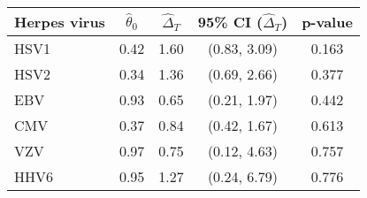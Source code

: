 \begin{tabular}{lcccc} 
\toprule
Herpes virus  & $\hat \theta_0$ & $\hat \Delta_T$ & 95\% CI ($\hat \Delta_T$) & p-value \\ 
\midrule
HSV1  & 0.42 & 1.60 & (0.83, 3.09)   & 0.163  \\
HSV2  & 0.34 & 1.36 & (0.69, 2.66)   & 0.377  \\
EBV      & 0.93 & 0.65 & (0.21, 1.97)   & 0.442  \\
CMV         & 0.37 & 0.84 & (0.42, 1.67)   & 0.613  \\
VZV  & 0.97 & 0.75 & (0.12, 4.63)   & 0.757  \\
HHV6     & 0.95 & 1.27 & (0.24, 6.79)   & 0.776  \\
\bottomrule
\end{tabular}